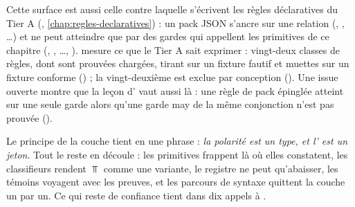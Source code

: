 Cette surface est aussi celle contre laquelle s'écrivent les règles déclaratives du Tier A (, \cref{chap:regles-declaratives}) : un pack JSON s'ancre sur une relation (, , \ldots) et ne peut atteindre \Error{} que par des gardes  qui appellent les primitives de ce chapitre (, , \ldots, ).  mesure ce que le Tier A sait exprimer : vingt-deux classes de règles, dont  sont prouvées chargées, tirant sur un fixture fautif et muettes sur un fixture conforme () ; la vingt-deuxième est exclue par conception (). Une issue ouverte montre que la leçon d' vaut aussi là : une règle de pack épinglée  atteint \Error{} sur une seule garde  alors qu'une garde may de la même conjonction n'est pas prouvée ().

\begin{remarque}
Le principe de la couche tient en une phrase : \emph{la polarité est un type, et l'\Error{} est un jeton}. Tout le reste en découle : les primitives frappent là où elles constatent, les classifieurs rendent $\Top$ comme une variante, le registre ne peut qu'abaisser, les témoins voyagent avec les preuves, et les parcours de syntaxe quittent la couche un par un. Ce qui reste de confiance tient dans dix appels à .
\end{remarque}


